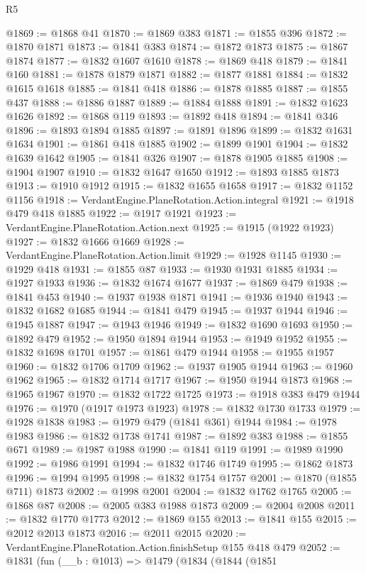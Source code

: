 \begin{lexlean}{R5}
\begin{coremodule}
@1869 := @1868 @41
@1870 := @1869 @383
@1871 := @1855 @396
@1872 := @1870 @1871
@1873 := @1841 @383
@1874 := @1872 @1873
@1875 := @1867 @1874
@1877 := @1832 @1607 @1610
@1878 := @1869 @418
@1879 := @1841 @160
@1881 := @1878 @1879 @1871
@1882 := @1877 @1881
@1884 := @1832 @1615 @1618
@1885 := @1841 @418
@1886 := @1878 @1885
@1887 := @1855 @437
@1888 := @1886 @1887
@1889 := @1884 @1888
@1891 := @1832 @1623 @1626
@1892 := @1868 @119
@1893 := @1892 @418
@1894 := @1841 @346
@1896 := @1893 @1894 @1885
@1897 := @1891 @1896
@1899 := @1832 @1631 @1634
@1901 := @1861 @418 @1885
@1902 := @1899 @1901
@1904 := @1832 @1639 @1642
@1905 := @1841 @326
@1907 := @1878 @1905 @1885
@1908 := @1904 @1907
@1910 := @1832 @1647 @1650
@1912 := @1893 @1885 @1873
@1913 := @1910 @1912
@1915 := @1832 @1655 @1658
@1917 := @1832 @1152 @1156
@1918 := VerdantEngine.PlaneRotation.Action.integral
@1921 := @1918 @479 @418 @1885
@1922 := @1917 @1921
@1923 := VerdantEngine.PlaneRotation.Action.next
@1925 := @1915 (@1922 @1923)
@1927 := @1832 @1666 @1669
@1928 := VerdantEngine.PlaneRotation.Action.limit
@1929 := @1928 @1145
@1930 := @1929 @418
@1931 := @1855 @87
@1933 := @1930 @1931 @1885
@1934 := @1927 @1933
@1936 := @1832 @1674 @1677
@1937 := @1869 @479
@1938 := @1841 @453
@1940 := @1937 @1938 @1871
@1941 := @1936 @1940
@1943 := @1832 @1682 @1685
@1944 := @1841 @479
@1945 := @1937 @1944
@1946 := @1945 @1887
@1947 := @1943 @1946
@1949 := @1832 @1690 @1693
@1950 := @1892 @479
@1952 := @1950 @1894 @1944
@1953 := @1949 @1952
@1955 := @1832 @1698 @1701
@1957 := @1861 @479 @1944
@1958 := @1955 @1957
@1960 := @1832 @1706 @1709
@1962 := @1937 @1905 @1944
@1963 := @1960 @1962
@1965 := @1832 @1714 @1717
@1967 := @1950 @1944 @1873
@1968 := @1965 @1967
@1970 := @1832 @1722 @1725
@1973 := @1918 @383 @479 @1944
@1976 := @1970 (@1917 @1973 @1923)
@1978 := @1832 @1730 @1733
@1979 := @1928 @1838
@1983 := @1979 @479 (@1841 @361) @1944
@1984 := @1978 @1983
@1986 := @1832 @1738 @1741
@1987 := @1892 @383
@1988 := @1855 @671
@1989 := @1987 @1988
@1990 := @1841 @119
@1991 := @1989 @1990
@1992 := @1986 @1991
@1994 := @1832 @1746 @1749
@1995 := @1862 @1873
@1996 := @1994 @1995
@1998 := @1832 @1754 @1757
@2001 := @1870 (@1855 @711) @1873
@2002 := @1998 @2001
@2004 := @1832 @1762 @1765
@2005 := @1868 @87
@2008 := @2005 @383 @1988 @1873
@2009 := @2004 @2008
@2011 := @1832 @1770 @1773
@2012 := @1869 @155
@2013 := @1841 @155
@2015 := @2012 @2013 @1873
@2016 := @2011 @2015
@2020 := VerdantEngine.PlaneRotation.Action.finishSetup @155 @418 @479
@2052 := @1831
    (fun (__b : @1013) =>
    @1479
      (@1834
        (@1844
          (@1851

\end{coremodule}
\end{lexlean}
